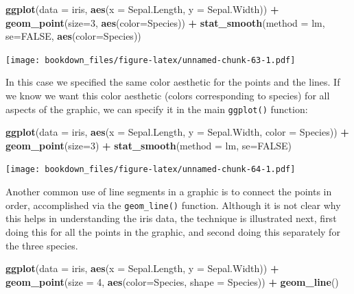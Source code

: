 \documentclass[]{krantz}
\makeatletter
\newenvironment{Shaded}{\begin{snugshade}}{\end{snugshade}}
\newcommand{\KeywordTok}[1]{\textcolor[rgb]{0.27,0.27,0.27}{\textbf{#1}}}
\newcommand{\DataTypeTok}[1]{\textcolor[rgb]{0.27,0.27,0.27}{#1}}
\newcommand{\DecValTok}[1]{\textcolor[rgb]{0.06,0.06,0.06}{#1}}
\newcommand{\StringTok}[1]{\textcolor[rgb]{0.5,0.5,0.5}{#1}}
\newcommand{\OtherTok}[1]{\textcolor[rgb]{0.37,0.37,0.37}{#1}}
\newcommand{\OperatorTok}[1]{\textcolor[rgb]{0.43,0.43,0.43}{\textbf{#1}}}
\newcommand{\NormalTok}[1]{#1}
\newenvironment{kframe}{%
\medskip{}
\setlength{\fboxsep}{.8em}
 \def\at@end@of@kframe{}%
 \ifinner\ifhmode%
  \def\at@end@of@kframe{\end{minipage}}%
  \begin{minipage}{\columnwidth}%
 \fi\fi%
 \def\FrameCommand##1{\hskip\@totalleftmargin \hskip-\fboxsep
 \colorbox{shadecolor}{##1}\hskip-\fboxsep
     \hskip-\linewidth \hskip-\@totalleftmargin \hskip\columnwidth}%
 \MakeFramed {\advance\hsize-\width
   \@totalleftmargin\z@ \linewidth\hsize
   \@setminipage}}%
 {\par\unskip\endMakeFramed%
 \at@end@of@kframe}
\renewenvironment{Shaded}{\begin{kframe}}{\end{kframe}}
\makeatother
\begin{document}
\begin{Shaded}
\begin{Highlighting}[]
\KeywordTok{ggplot}\NormalTok{(}\DataTypeTok{data =}\NormalTok{ iris, }\KeywordTok{aes}\NormalTok{(}\DataTypeTok{x =}\NormalTok{ Sepal.Length, }\DataTypeTok{y =}\NormalTok{ Sepal.Width)) }\OperatorTok{+}\StringTok{ }
\StringTok{    }\KeywordTok{geom_point}\NormalTok{(}\DataTypeTok{size=}\DecValTok{3}\NormalTok{, }\KeywordTok{aes}\NormalTok{(}\DataTypeTok{color=}\NormalTok{Species)) }\OperatorTok{+}\StringTok{ }
\StringTok{    }\KeywordTok{stat_smooth}\NormalTok{(}\DataTypeTok{method =}\NormalTok{ lm, }\DataTypeTok{se=}\OtherTok{FALSE}\NormalTok{, }\KeywordTok{aes}\NormalTok{(}\DataTypeTok{color=}\NormalTok{Species))}
\end{Highlighting}
\end{Shaded}

\texttt{[image: bookdown\_files/figure-latex/unnamed-chunk-63-1.pdf]}

In this case we specified the same color aesthetic for the points and
the lines. If we know we want this color aesthetic (colors corresponding
to species) for all aspects of the graphic, we can specify it in the
main \texttt{ggplot()} function:

\begin{Shaded}
\begin{Highlighting}[]
\KeywordTok{ggplot}\NormalTok{(}\DataTypeTok{data =}\NormalTok{ iris, }\KeywordTok{aes}\NormalTok{(}\DataTypeTok{x =}\NormalTok{ Sepal.Length, }\DataTypeTok{y =}\NormalTok{ Sepal.Width, }\DataTypeTok{color =}\NormalTok{ Species)) }\OperatorTok{+}\StringTok{ }
\StringTok{    }\KeywordTok{geom_point}\NormalTok{(}\DataTypeTok{size=}\DecValTok{3}\NormalTok{) }\OperatorTok{+}\StringTok{ }\KeywordTok{stat_smooth}\NormalTok{(}\DataTypeTok{method =}\NormalTok{ lm, }\DataTypeTok{se=}\OtherTok{FALSE}\NormalTok{)}
\end{Highlighting}
\end{Shaded}

\texttt{[image: bookdown\_files/figure-latex/unnamed-chunk-64-1.pdf]}

Another common use of line segments in a graphic is to connect the
points in order, accomplished via the \texttt{geom\_line()} function.
Although it is not clear why this helps in understanding the iris data,
the technique is illustrated next, first doing this for all the points
in the graphic, and second doing this separately for the three species.

\begin{Shaded}
\begin{Highlighting}[]
\KeywordTok{ggplot}\NormalTok{(}\DataTypeTok{data =}\NormalTok{ iris, }\KeywordTok{aes}\NormalTok{(}\DataTypeTok{x =}\NormalTok{ Sepal.Length, }\DataTypeTok{y =}\NormalTok{ Sepal.Width)) }\OperatorTok{+}\StringTok{ }
\StringTok{    }\KeywordTok{geom_point}\NormalTok{(}\DataTypeTok{size =} \DecValTok{4}\NormalTok{, }\KeywordTok{aes}\NormalTok{(}\DataTypeTok{color=}\NormalTok{Species, }\DataTypeTok{shape =}\NormalTok{ Species)) }\OperatorTok{+}\StringTok{ }
\StringTok{    }\KeywordTok{geom_line}\NormalTok{()}
\end{Highlighting}
\end{Shaded}
\end{document}
